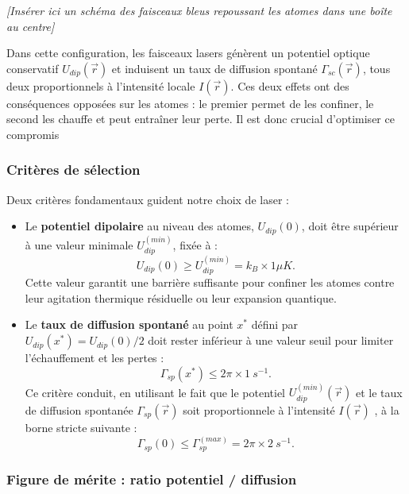 \begin{center}
\textit{[Insérer ici un schéma des faisceaux bleus repoussant les atomes dans une boîte au centre]}
\end{center}

\vspace{1em}

Dans cette configuration, les faisceaux lasers génèrent un potentiel optique conservatif $U_{dip}(\vec{r})$ et induisent un taux de diffusion spontané $\Gamma_{sc}(\vec{r})$, tous deux proportionnels à l’intensité locale $I(\vec{r})$. Ces deux effets ont des conséquences opposées sur les atomes : le premier permet de les confiner, le second les chauffe et peut entraîner leur perte. Il est donc crucial d’optimiser ce compromis

\subsubsection*{Critères de sélection}

Deux critères fondamentaux guident notre choix de laser :
\begin{itemize}[label = $\bullet$]
	\item Le {\bf potentiel dipolaire} au niveau des atomes, $U_{dip}(0)$, doit être supérieur à une valeur minimale $U_{dip}^{(min)}$, fixée à :
		\begin{equation}
			U_{dip}(0)  \geq U_{dip}^{(min)} = k_B \times 1 \mu K.	
		\end{equation}
		Cette valeur garantit une barrière suffisante pour confiner les atomes contre leur agitation thermique résiduelle ou leur expansion quantique.
	\item Le {\bf taux de diffusion spontané}  au point $x^\ast$ défini par $U_{dip}(x^\ast) = U_{dip}(0)/2$ doit rester inférieur à une valeur seuil pour limiter l’échauffement et les pertes :
		\begin{equation}
			\Gamma_{sp}(x^\ast) \leq 2\pi \times 1~s^{-1}.	
		\end{equation}
		Ce critère conduit, en utilisant le fait que le potentiel $U_{dip}^{(min)}(\vec{r})$ et le taux de diffusion spontanée $\Gamma_{sp}(\vec{r})$ soit proportionnele à l’intensité $I(\vec{r})$ , à la borne stricte suivante :
		\begin{equation}
			\Gamma_{sp}(0) \leq \Gamma_{sp}^{(max)} = 2\pi \times 2~s^{-1}.	
		\end{equation}
\end{itemize}

\subsubsection*{Figure de mérite : ratio potentiel / diffusion}

